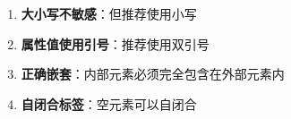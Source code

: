 \begin{enumerate}
\def\labelenumi{\arabic{enumi}.}
\item
  \textbf{大小写不敏感}：但推荐使用小写

\begin{Shaded}
\begin{Highlighting}[]
\DataTypeTok{\textless{}}\DataTypeTok{\textgreater{}}\DataTypeTok{\textless{}/}\DataTypeTok{\textgreater{}}  
\DataTypeTok{\textless{}}\DataTypeTok{\textgreater{}}\DataTypeTok{\textless{}/}\DataTypeTok{\textgreater{}}    
\end{Highlighting}
\end{Shaded}
\item
  \textbf{属性值使用引号}：推荐使用双引号

\begin{Shaded}
\begin{Highlighting}[]
\DataTypeTok{\textless{}}\OperatorTok{=}\OperatorTok{=}\DataTypeTok{\textgreater{}}
\end{Highlighting}
\end{Shaded}
\item
  \textbf{正确嵌套}：内部元素必须完全包含在外部元素内

\begin{Shaded}
\begin{Highlighting}[]
\DataTypeTok{\textless{}}\DataTypeTok{\textgreater{}}\DataTypeTok{\textless{}}\DataTypeTok{\textgreater{}}\DataTypeTok{\textless{}/}\DataTypeTok{\textgreater{}}\DataTypeTok{\textless{}/}\DataTypeTok{\textgreater{}}

\DataTypeTok{\textless{}}\DataTypeTok{\textgreater{}}\DataTypeTok{\textless{}}\DataTypeTok{\textgreater{}}\DataTypeTok{\textless{}/}\DataTypeTok{\textgreater{}\textless{}/}\DataTypeTok{\textgreater{}}
\end{Highlighting}
\end{Shaded}
\item
  \textbf{自闭合标签}：空元素可以自闭合

\begin{Shaded}
\begin{Highlighting}[]
\DataTypeTok{\textless{}}\OtherTok{ }\DataTypeTok{/\textgreater{}}
\DataTypeTok{\textless{}}\OperatorTok{=}\OperatorTok{=}\OtherTok{ }\DataTypeTok{/\textgreater{}}
\end{Highlighting}
\end{Shaded}
\end{enumerate}

